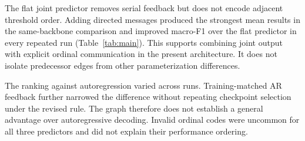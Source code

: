 \documentclass[a4paper,fleqn]{cas-sc}
\begin{document}
\begin{table}
\centering
\caption{Published and current MESSIDOR results. Published values are taken from the AOR-DR comparison and use its evaluation protocol; QWK was not reported. Current RETFound values are mean $\pm$ sample standard deviation over three runs. Results from different protocols are not directly comparable.}
\label{tab:overall}
\small
\setlength{\tabcolsep}{3.5pt}
\end{table}


The flat joint predictor removes serial feedback but does not encode adjacent threshold order. Adding directed messages produced the strongest mean results in the same-backbone comparison and improved macro-F1 over the flat predictor in every repeated run (Table~\ref{tab:main}). This supports combining joint output with explicit ordinal communication in the present architecture. It does not isolate predecessor edges from other parameterization differences.

The ranking against autoregression varied across runs. Training-matched AR feedback further narrowed the difference without repeating checkpoint selection under the revised rule. The graph therefore does not establish a general advantage over autoregressive decoding. Invalid ordinal codes were uncommon for all three predictors and did not explain their performance ordering.
\end{document}
